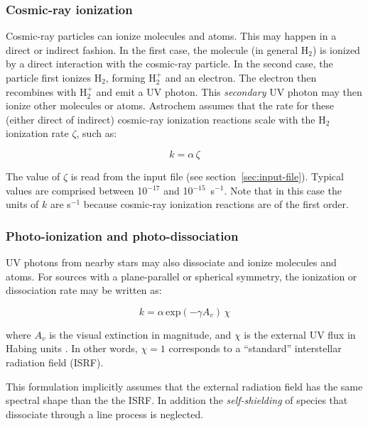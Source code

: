 \documentclass[a4paper,12pt]{article}
\begin{document}
\subsubsection{Cosmic-ray ionization}
\label{sec:cosm-ray-ioniz}

Cosmic-ray particles can ionize molecules and atoms. This may happen
in a direct or indirect fashion. In the first case, the molecule (in
general H$_{2}$) is ionized by a direct interaction with the
cosmic-ray particle. In the second case, the particle first ionizes
H$_{2}$, forming H$_{2}^{+}$ and an electron. The electron then
recombines with H$_{2}^{+}$ and emit a UV photon. This
\emph{secondary} UV photon may then ionize other molecules or
atoms. Astrochem assumes that the rate for these (either direct of
indirect) cosmic-ray ionization reactions scale with the H$_{2}$
ionization rate $\zeta$, such as:

\begin{equation}
  k = \alpha  \, \zeta
  \label{eq:cosmic-ray-ionization}
\end{equation}

\noindent
The value of $\zeta$ is read from the input file (see
section~\ref{sec:input-file}). Typical values are comprised between
10$^{-17}$ and 10$^{-15}$~s$^{-1}$. Note that in this case the units
of $k$ are s$^{-1}$ because cosmic-ray ionization reactions are of the
first order.

\subsubsection{Photo-ionization and photo-dissociation}
\label{sec:photo-ioniz-photo}

UV photons from nearby stars may also dissociate and ionize molecules
and atoms. For sources with a plane-parallel or spherical symmetry,
the ionization or dissociation rate may be written as:

\begin{equation}
  k = \alpha \, \mathrm{exp} \left( -\gamma A_{v} \right) \, \chi
  \label{eq:photo-ionization}
\end{equation}

\noindent
where $A_{v}$ is the visual extinction in magnitude, and $\chi$ is the
external UV flux in Habing units \citep{Habing68}. In other words,
$\chi = 1$ corresponds to a ``standard'' interstellar radiation field
(ISRF).

This formulation implicitly assumes that the external radiation field
has the same spectral shape than the the ISRF. In addition the
\emph{self-shielding} of species that dissociate through a line
process \citep[e.g. CO;][]{vanDishoeck86} is neglected.
\end{document}
